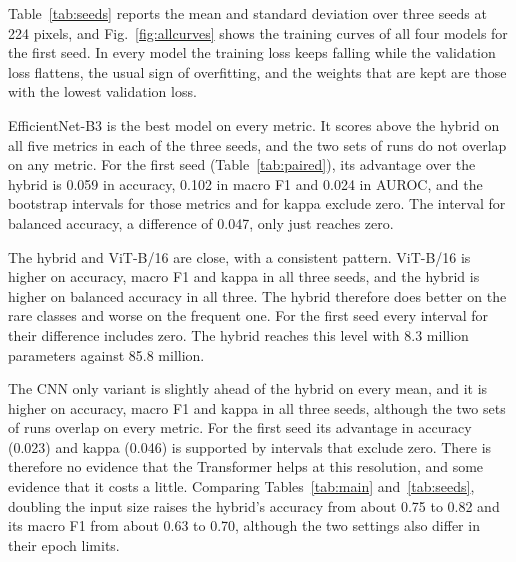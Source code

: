 \documentclass[runningheads]{llncs}
\begin{document}
Table~\ref{tab:seeds} reports the mean and standard deviation over three seeds at 224 pixels, and Fig.~\ref{fig:allcurves} shows the training curves of all four models for the first seed. In every model the training loss keeps falling while the validation loss flattens, the usual sign of overfitting, and the weights that are kept are those with the lowest validation loss.

EfficientNet-B3 is the best model on every metric. It scores above the hybrid on all five metrics in each of the three seeds, and the two sets of runs do not overlap on any metric. For the first seed (Table~\ref{tab:paired}), its advantage over the hybrid is 0.059 in accuracy, 0.102 in macro F1 and 0.024 in AUROC, and the bootstrap intervals for those metrics and for kappa exclude zero. The interval for balanced accuracy, a difference of 0.047, only just reaches zero.

The hybrid and ViT-B/16 are close, with a consistent pattern. ViT-B/16 is higher on accuracy, macro F1 and kappa in all three seeds, and the hybrid is higher on balanced accuracy in all three. The hybrid therefore does better on the rare classes and worse on the frequent one. For the first seed every interval for their difference includes zero. The hybrid reaches this level with 8.3 million parameters against 85.8 million.

The CNN only variant is slightly ahead of the hybrid on every mean, and it is higher on accuracy, macro F1 and kappa in all three seeds, although the two sets of runs overlap on every metric. For the first seed its advantage in accuracy (0.023) and kappa (0.046) is supported by intervals that exclude zero. There is therefore no evidence that the Transformer helps at this resolution, and some evidence that it costs a little. Comparing Tables~\ref{tab:main} and~\ref{tab:seeds}, doubling the input size raises the hybrid's accuracy from about 0.75 to 0.82 and its macro F1 from about 0.63 to 0.70, although the two settings also differ in their epoch limits.
\end{document}
